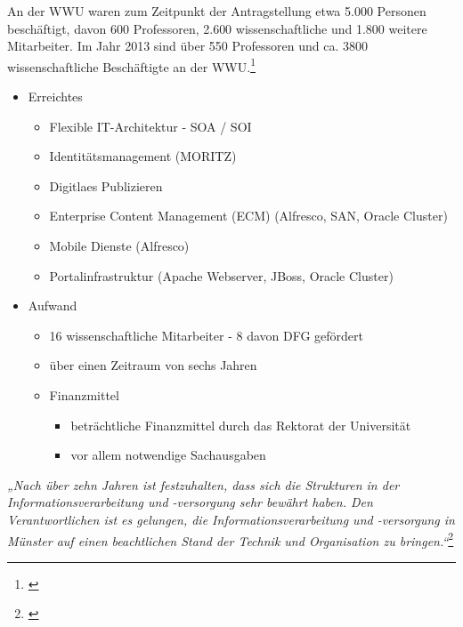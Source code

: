 
An der WWU waren zum Zeitpunkt der Antragstellung etwa 5.000 Personen beschäftigt, davon 600 Professoren, 2.600 wissenschaftliche und 1.800 weitere Mitarbeiter. Im Jahr 2013 sind über 550 Professoren und ca. 3800 wissenschaftliche Beschäftigte an der WWU.\footnote{\cite{vogl_bericht_2013}}

\newpage

\begin{itemize}
	\item Erreichtes
	\begin{itemize}
		\item Flexible IT-Architektur - SOA / SOI
		\item Identitätsmanagement (MORITZ)
		\item Digitlaes Publizieren
		\item Enterprise Content Management (ECM) (Alfresco, SAN, Oracle Cluster)
		\item Mobile Dienste (Alfresco)
		\item Portalinfrastruktur (Apache Webserver, JBoss, Oracle Cluster)
	\end{itemize}
\end{itemize}

		
\begin{itemize}	
	\item Aufwand
	\begin{itemize}
		\item 16 wissenschaftliche Mitarbeiter - 8 davon DFG gefördert
		\item über einen Zeitraum von sechs Jahren
		\item Finanzmittel
		\begin{itemize}
			\item beträchtliche Finanzmittel durch das Rektorat der Universität
			\item vor allem notwendige Sachausgaben
		\end{itemize}
	\end{itemize}
\end{itemize}

\textit{„Nach über zehn Jahren ist festzuhalten, dass sich die Strukturen in der Informationsverarbeitung und -versorgung sehr bewährt haben. Den Verantwortlichen ist es gelungen, die Informationsverarbeitung und -versorgung in Münster auf einen beachtlichen Stand der Technik und Organisation zu bringen.“}\footnote{\cite{bode_informationsmanagement_2010}}

